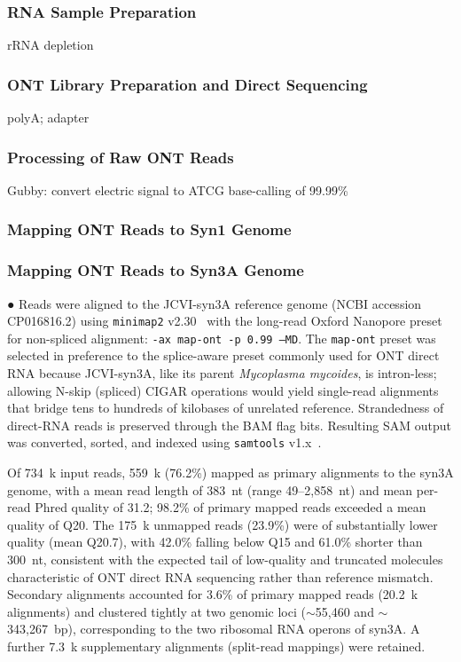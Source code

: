 \subsubsection{RNA Sample Preparation}

rRNA depletion

\subsubsection{ONT Library Preparation and Direct Sequencing}

polyA; adapter

\subsubsection{Processing of Raw ONT Reads}

Gubby: convert electric signal to ATCG
base-calling of 99.99\%

\subsubsection{Mapping ONT Reads to Syn1 Genome}

\subsubsection{Mapping ONT Reads to Syn3A Genome}

● Reads were aligned to the JCVI-syn3A reference genome (NCBI accession CP016816.2) using \texttt{minimap2} v2.30~\cite{li2018minimap2} with the long-read Oxford Nanopore preset for non-spliced alignment: \texttt{-ax map-ont -p 0.99 --MD}. The \texttt{map-ont} preset was selected in preference to the splice-aware preset commonly used for ONT direct RNA because JCVI-syn3A, like its parent \emph{Mycoplasma mycoides}, is intron-less; allowing N-skip (spliced) CIGAR operations would yield single-read alignments that bridge tens to hundreds of kilobases of unrelated reference. Strandedness of direct-RNA reads is preserved through the BAM flag bits. Resulting SAM output was converted, sorted, and indexed using \texttt{samtools} v1.x~\cite{li2009samtools}.

Of 734~k input reads, 559~k (76.2\%) mapped as primary alignments to the syn3A genome, with a mean read length of 383~nt (range 49--2{,}858~nt) and mean per-read Phred quality of 31.2; 98.2\% of primary mapped reads exceeded a mean quality of Q20. The 175~k unmapped reads (23.9\%) were of substantially lower quality (mean Q20.7), with 42.0\% falling below Q15 and 61.0\% shorter than 300~nt, consistent with the expected tail of low-quality and truncated molecules characteristic of ONT direct RNA sequencing rather than reference mismatch. Secondary alignments accounted for 3.6\% of primary mapped reads (20.2~k alignments) and clustered tightly at two genomic loci ($\sim$55{,}460 and $\sim$343{,}267~bp), corresponding to the two ribosomal RNA operons of syn3A. A further 7.3~k supplementary alignments (split-read mappings) were retained.
  
